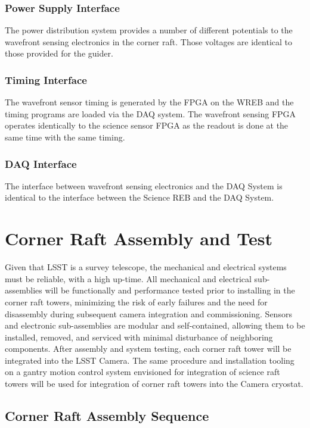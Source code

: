 \subsubsection{Power Supply Interface}
The power distribution system provides a number of different potentials to the wavefront sensing
electronics in the corner raft. Those voltages are identical to those provided for the guider.

\subsubsection{Timing Interface}
The wavefront sensor timing is generated by the FPGA on the WREB and the timing programs are loaded
via the DAQ system. The wavefront sensing FPGA operates identically to the science sensor FPGA as the
readout is done at the same time with the same timing.

\subsubsection{DAQ Interface}
The interface between wavefront sensing electronics and the DAQ System is identical to the interface
between the Science REB and the DAQ System.

\section{Corner Raft Assembly and Test}

Given that LSST is a survey telescope, the mechanical and electrical systems must be reliable, with a high
up-time. All mechanical and electrical sub-assemblies will be functionally and performance tested prior
to installing in the corner raft towers, minimizing the risk of early failures and the need for disassembly
during subsequent camera integration and commissioning. Sensors and electronic sub-assemblies are
modular and self-contained, allowing them to be installed, removed, and serviced with minimal
disturbance of neighboring components.
After assembly and system testing, each corner raft tower will be integrated into the LSST Camera. The
same procedure and installation tooling on a gantry motion control system envisioned for integration of
science raft towers will be used for integration of corner raft towers into the Camera cryostat.

\subsection{Corner Raft Assembly Sequence}


